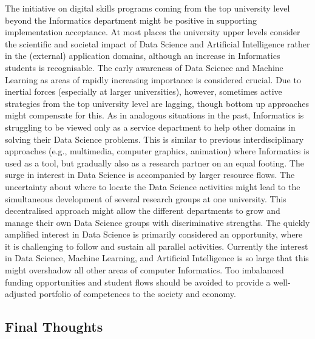 The initiative on digital skills programs coming from the top university level beyond the Informatics department might be positive in supporting implementation acceptance. At most places the university upper levels consider the scientific and societal impact of Data Science and Artificial Intelligence rather in the (external) application domains, although an increase in Informatics students is recognisable. The early awareness of Data Science and Machine Learning as areas of rapidly increasing importance is considered crucial. Due to inertial forces (especially at larger universities), however, sometimes active strategies from the top university level are lagging, though bottom up approaches might compensate for this. As in analogous situations in the past, Informatics is struggling to be viewed only as a service department to help other domains in solving their Data Science problems. This is similar to previous interdisciplinary approaches (e.g., multimedia, computer graphics, animation) where Informatics is used as a tool, but gradually also as a research partner on an equal footing. The surge in interest in Data Science is accompanied by larger resource flows. The uncertainty about where to locate the Data Science activities might lead to the simultaneous development of several research groups at one university. This decentralised approach might allow the different departments to grow and manage their own Data Science groups with discriminative strengths. The quickly amplified interest in Data Science is primarily considered an opportunity, where it is challenging to follow and sustain all parallel activities. Currently the interest in Data Science, Machine Learning, and Artificial Intelligence is so large that this might overshadow all other areas of computer Informatics. Too imbalanced funding opportunities and student flows should be avoided to provide a well-adjusted portfolio of competences to the society and economy.

\subsection{Final Thoughts}

